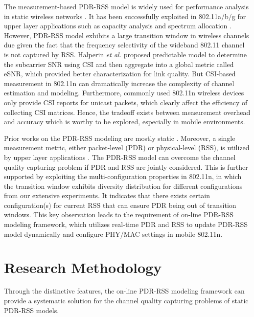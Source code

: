 \documentclass[draftclsnofoot,journal,onecolumn,11pt]{IEEEtran}
\begin{document}
The measurement-based PDR-RSS model is widely used for performance analysis in static wireless networks \cite{reis2006model}. It has been successfully exploited in 802.11a/b/g for upper layer applications such as capacity analysis \cite{kashyap2007capacity} and spectrum allocation \cite{k.rayanchu:fluid:}. However, PDR-RSS model exhibits a large transition window in wireless channels due given the fact that the frequency selectivity of the wideband 802.11 channel is not captured by RSS. Halperin \textit{et al.} \cite{Halperin2010predictable} proposed predictable model to determine the subcarrier SNR using CSI and then aggregate into a global metric called eSNR, which provided better characterization for link quality. But CSI-based measurement in 802.11n can dramatically increase the complexity of channel estimation and modeling. Furthermore, commonly used 802.11n wireless devices only provide CSI reports for unicast packets, which clearly affect the efficiency of collecting CSI matrices. Hence, the tradeoff exists between measurement overhead and accuracy which is worthy to be explored, especially in mobile environments.

Prior works on the PDR-RSS modeling are mostly static \cite{kashyap2007capacity} \cite{kolar2011mesh} \cite{reis2006model}. Moreover, a single measurement metric, either packet-level (PDR) or physical-level (RSS), is utilized by upper layer applications\cite{judd2008efficient} \cite{zhang2008practical}. The PDR-RSS model can overcome the channel quality capturing problem if PDR and RSS are jointly considered. This is further supported by exploiting the multi-configuration properties in 802.11n, in which the transition window exhibits diversity distribution for different configurations from our extensive experiments. It indicates that there exists certain configuration(s) for current RSS that can ensure PDR being out of transition windows. This key observation leads to the requirement of on-line PDR-RSS modeling framework, which utilizes real-time PDR and RSS to update PDR-RSS model dynamically and configure PHY/MAC settings in mobile 802.11n.

\section{Research Methodology}

Through the distinctive features, the on-line PDR-RSS modeling framework can provide a systematic solution for the channel quality capturing problems of static PDR-RSS models.
\end{document}
